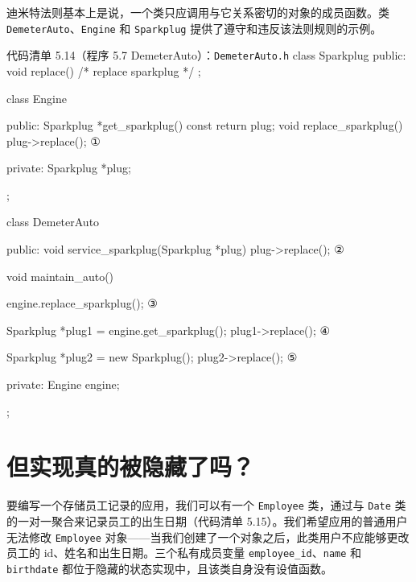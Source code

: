 迪米特法则基本上是说，一个类只应调用与它关系密切的对象的成员函数。类 \texttt{Demeter\allowbreak{}Auto}、\texttt{Engine} 和 \texttt{Sparkplug} 提供了遵守和违反该法则规则的示例。

\begin{codeboxt}{代码清单 5.14（程序 5.7 DemeterAuto）：\texttt{Demeter\allowbreak{}Auto.\allowbreak{}h}}
class Sparkplug
{
public:
    void replace() { /* replace sparkplug */ }
};

class Engine
{
public:
    Sparkplug *get_sparkplug() const { return plug; }
    void replace_sparkplug()
    {
        plug->replace();                         ①
    }

private:
    Sparkplug *plug;
};

class DemeterAuto
{
public:
    void service_sparkplug(Sparkplug *plug)
    {
        plug->replace();                         ②
    }

    void maintain_auto()
    {
        engine.replace_sparkplug();              ③

        Sparkplug *plug1 = engine.get_sparkplug();
        plug1->replace();                        ④

        Sparkplug *plug2 = new Sparkplug();
        plug2->replace();                        ⑤
    }

private:
    Engine engine;
};
\end{codeboxt}
\par
{}\par
{}\par
{}\par
{}\par

\section{但实现真的被隐藏了吗？}

要编写一个存储员工记录的应用，我们可以有一个 \texttt{Employee} 类，通过与 \texttt{Date} 类的一对一聚合来记录员工的出生日期（代码清单 5.15）。我们希望应用的普通用户无法修改 \texttt{Employee} 对象——当我们创建了一个对象之后，此类用户不应能够更改员工的 id、姓名和出生日期。三个私有成员变量 \texttt{employee\_\allowbreak{}id}、\texttt{name} 和 \texttt{birthdate} 都位于隐藏的状态实现中，且该类自身没有设值函数。

